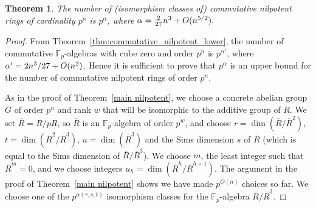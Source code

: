 \documentclass[12pt]{article}
\newtheorem{Thm}{Theorem}[section]
\begin{document}
\begin{Thm}
\label{thm:commutative_nilpotent}
The number of (isomorphism classes of) commutative nilpotent rings of cardinality $p^{n}$ is $p^{\alpha}$, where
$
\alpha = \frac{2}{27}n^{3} + \mathnormal{O}(n^{5/2}).
$
\end{Thm}
\begin{proof}
From Theorem~\ref{thm:commutative_nilpotent_lower}, the number of commutative $\mathbb{F}_{p}$-algebras with cube zero and order $p^{n}$ is $p^{\alpha'}$, where $\alpha' = 2n^{3}/27 + \mathnormal{O}(n^{2})$. Hence it is sufficient to prove that $p^{\alpha}$ is an upper bound for the number of commutative nilpotent rings of order $p^{n}$.

As in the proof of Theorem~\ref{main nilpotent}, we choose a concrete abelian group $G$ of order $p^n$ and rank $w$ that will be isomorphic to the additive group of $R$. We set $\overline{R}=R/pR$, so $\overline{R}$ is an $\mathbb{F}_p$-algebra of order $p^w$, and choose $r=\dim (\overline{R}/\overline{R}^2)$, $t=\dim (\overline{R}^2/\overline{R}^3)$, $u=\dim(\overline{R}^3)$ and the Sims dimension $s$ of $\overline{R}$ (which is equal to the Sims dimension of $\overline{R}/\overline{R}^3$). We choose $m$, the least integer such that $\overline{R}^m=0$, and we choose integers $u_h=\dim (\overline{R}^h/\overline{R}^{h+1})$.
The argument in the proof of Theorem~\ref{main nilpotent} shows we have made $p^{O(n)}$ choices so far. We choose one of the $p^{\alpha(r,s,t)}$ isomorphism classes for the $\mathbb{F}_p$-algebra $\overline{R}/\overline{R}^3$.


\end{proof}
\end{document}
